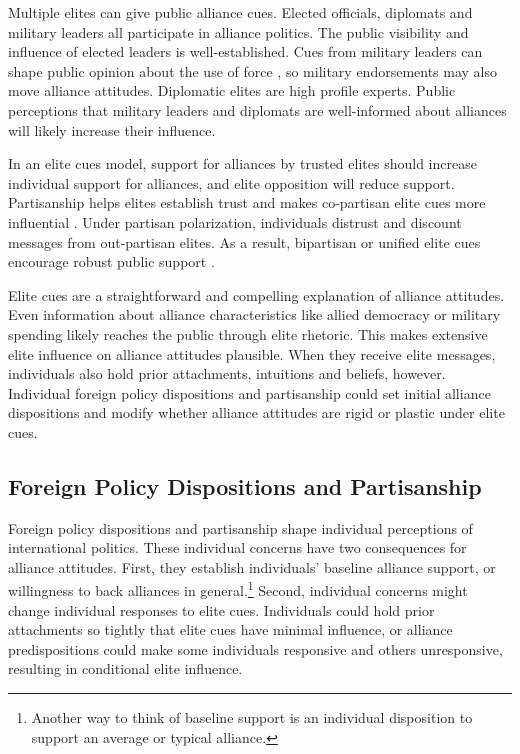 \documentclass[12pt]{article}
\begin{document}
Multiple elites can give public alliance cues.
Elected officials, diplomats and military leaders all participate in alliance politics.
The public visibility and influence of elected leaders is well-established.  
Cues from military leaders can shape public opinion about the use of force \citep{Golbyetal2018}, so military endorsements may also move alliance attitudes. 
Diplomatic elites are high profile experts. 
Public perceptions that military leaders and diplomats are well-informed about alliances will likely increase their influence. 


In an elite cues model, support for alliances by trusted elites should increase individual support for alliances, and elite opposition will reduce support.   
Partisanship helps elites establish trust and makes co-partisan elite cues more influential \citep{Druckmanetal2013}.
Under partisan polarization, individuals distrust and discount messages from out-partisan elites.
As a result, bipartisan or unified elite cues encourage robust public support \citep{Berinsky2007}.


Elite cues are a straightforward and compelling explanation of alliance attitudes.
Even information about alliance characteristics like allied democracy or military spending likely reaches the public through elite rhetoric. 
This makes extensive elite influence on alliance attitudes plausible. 
When they receive elite messages, individuals also hold prior attachments, intuitions and beliefs, however.
Individual foreign policy dispositions and partisanship could set initial alliance dispositions and modify whether alliance attitudes are rigid or plastic under elite cues. 


\subsection{Foreign Policy Dispositions and Partisanship}


Foreign policy dispositions and partisanship shape individual perceptions of international politics. 
These individual concerns have two consequences for alliance attitudes. 
First, they establish individuals' baseline alliance support, or willingness to back alliances in general.\footnote{Another way to think of baseline support is an individual disposition to support an average or typical alliance.} 
Second, individual concerns might change individual responses to elite cues. 
Individuals could hold prior attachments so tightly that elite cues have minimal influence, or alliance predispositions could make some individuals responsive and others unresponsive, resulting in conditional elite influence.
\end{document}
